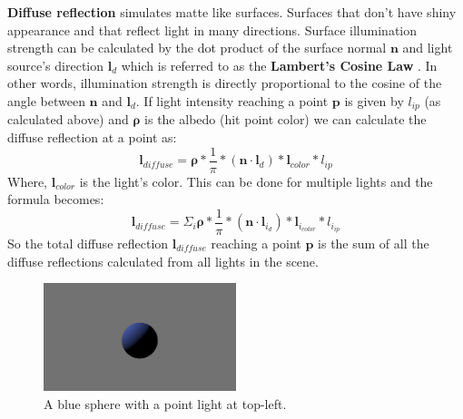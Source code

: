 \documentclass[11pt,a4paper]{article}
\begin{document}
	\textbf{Diffuse reflection} simulates matte like surfaces. Surfaces that don't have shiny appearance and that reflect light in many directions. Surface illumination strength can be calculated by the dot product of the surface normal $\boldsymbol{n}$ and light source's direction $\boldsymbol{l}_{d}$ which is referred to as the \textbf{Lambert's Cosine Law} \cite{lambertscosinelaw}. In other words, illumination strength is directly proportional to the cosine of the angle between $\boldsymbol{n}$ and $\boldsymbol{l}_{d}$. If light intensity reaching a point $\boldsymbol{p}$ is given by $l_{ip}$ (as calculated above) and $\boldsymbol{\rho}$ is the albedo (hit point color) we can calculate the diffuse reflection at a point as:
	\begin{equation}
		\boldsymbol{l}_{diffuse} = \boldsymbol{\rho} * \frac{1}{\pi} * (\boldsymbol{n} \cdot \boldsymbol{l}_{d}) * \boldsymbol{l}_{color} * l_{ip}
	\end{equation}
	Where, $\boldsymbol{l}_{color}$ is the light's color. This can be done for multiple lights and the formula becomes:
	\begin{equation}
	\boldsymbol{l}_{diffuse} = \Sigma_{i} \boldsymbol{\rho} * \frac{1}{\pi} * (\boldsymbol{n} \cdot \boldsymbol{l}_{i_{d}}) * \boldsymbol{l}_{i_{color}} * l_{i_{ip}}
	\end{equation}
	So the total diffuse reflection $\boldsymbol{l}_{diffuse}$ reaching a point $\boldsymbol{p}$ is the sum of all the diffuse reflections calculated from all lights in the scene.
	\begin{figure}[H]
		\centering
		\captionsetup{justification=centering}
		\includegraphics[width=0.5\textwidth]{diffuse_reflection.png}\quad
		\caption{A blue sphere with a point light at top-left.}
	\end{figure}
\end{document}
